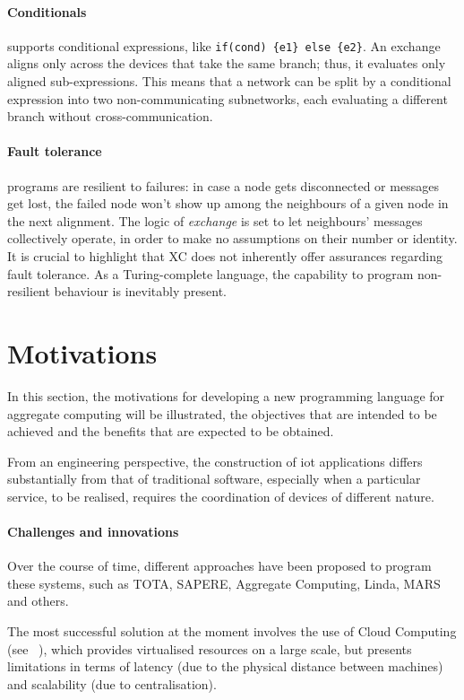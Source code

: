 \paragraph{Conditionals}
\xc{} supports conditional expressions, like \lstinline|if(cond) {e1} else {e2}|.
An exchange aligns only across the devices that take the same branch; thus, it evaluates only aligned sub-expressions.
This means that a network can be split by a conditional expression into two non-communicating subnetworks, each
evaluating a different branch without cross-communication.

\paragraph{Fault tolerance}
\xc{} programs are resilient to failures: in case a node gets disconnected or messages get lost, the failed node won't
show up among the neighbours of a given node in the next alignment.
The logic of \emph{exchange} is set to let neighbours' messages collectively operate, in order to make no assumptions
on their number or identity.
It is crucial to highlight that XC does not inherently offer assurances regarding fault tolerance.
As a Turing-complete language, the capability to program non-resilient behaviour is inevitably present.

\section{Motivations}
\label{sec:motivations}

In this section, the motivations for developing a new programming language for aggregate computing will be illustrated,
the objectives that are intended to be achieved and the benefits that are expected to be obtained.

From an engineering perspective, the construction of \ac{iot} applications differs substantially from that of traditional
software, especially when a particular service, to be realised, requires the coordination of devices of different nature.

\paragraph{Challenges and innovations}
Over the course of time, different approaches have been proposed to program these systems, such as TOTA, SAPERE, Aggregate
Computing, Linda, MARS and others. %

The most successful solution at the moment involves the use of Cloud Computing (see ~),
which provides virtualised resources on a large scale, but presents limitations in terms of latency (due to the physical
distance between machines) and scalability (due to centralisation).

